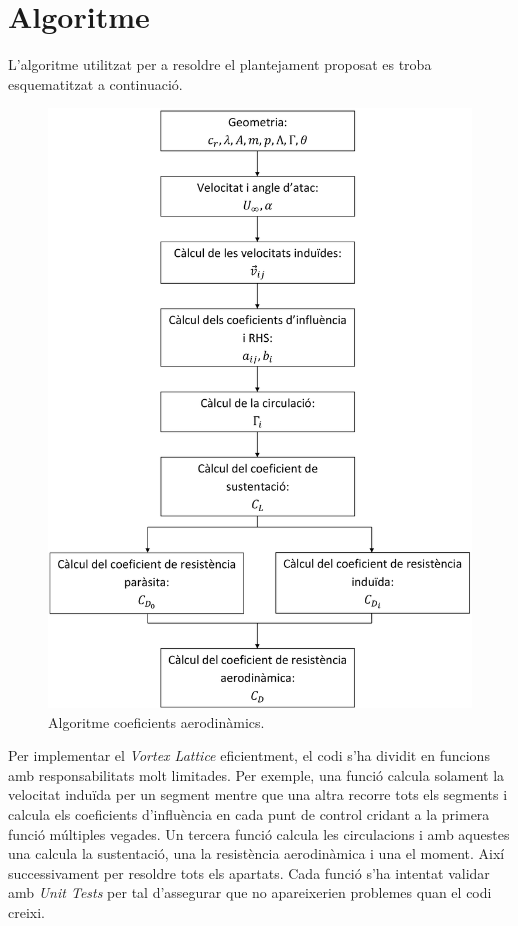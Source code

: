 \section{Algoritme}
\label{algoritmeala}
L'algoritme utilitzat per a resoldre el plantejament proposat es troba esquematitzat a continuació.

\begin{figure}[H]
	\centering
	\includegraphics[scale=0.170]{./plots/algoritmewing}
	\caption{Algoritme coeficients aerodinàmics.}
\end{figure}
Per implementar el \textit{Vortex Lattice} eficientment, el codi s'ha dividit en funcions  amb responsabilitats molt limitades. Per exemple, una funció calcula solament la velocitat induïda per un segment mentre que una altra recorre tots els segments i calcula els coeficients d'influència en cada punt de control cridant a la primera funció múltiples vegades. Un tercera funció calcula les circulacions i amb aquestes una calcula la sustentació, una  la resistència aerodinàmica i una el moment. Així successivament per resoldre tots els apartats. Cada funció s'ha intentat validar amb \textit{Unit Tests} per tal d'assegurar que no apareixerien problemes quan el codi creixi.
